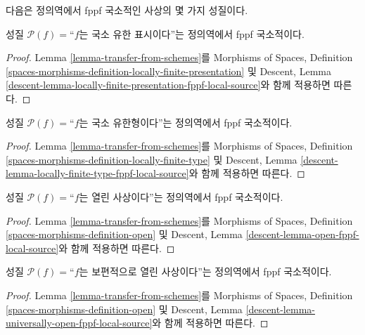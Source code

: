 \noindent
다음은 정의역에서 fppf 국소적인 사상의 몇 가지 성질이다.

\begin{lemma}
\label{lemma-locally-finite-presentation-fppf-local-source}
성질 $\mathcal{P}(f)=$``$f$는 국소 유한 표시이다''는 정의역에서 fppf
국소적이다.
\end{lemma}

\begin{proof}
Lemma \ref{lemma-transfer-from-schemes}를 Morphisms of Spaces, Definition
\ref{spaces-morphisms-definition-locally-finite-presentation} 및 Descent,
Lemma \ref{descent-lemma-locally-finite-presentation-fppf-local-source}와
함께 적용하면 따른다.
\end{proof}

\begin{lemma}
\label{lemma-locally-finite-type-fppf-local-source}
성질 $\mathcal{P}(f)=$``$f$는 국소 유한형이다''는 정의역에서 fppf
국소적이다.
\end{lemma}

\begin{proof}
Lemma \ref{lemma-transfer-from-schemes}를 Morphisms of Spaces, Definition
\ref{spaces-morphisms-definition-locally-finite-type} 및 Descent, Lemma
\ref{descent-lemma-locally-finite-type-fppf-local-source}와 함께 적용하면
따른다.
\end{proof}

\begin{lemma}
\label{lemma-open-fppf-local-source}
성질 $\mathcal{P}(f)=$``$f$는 열린 사상이다''는 정의역에서 fppf
국소적이다.
\end{lemma}

\begin{proof}
Lemma \ref{lemma-transfer-from-schemes}를 Morphisms of Spaces, Definition
\ref{spaces-morphisms-definition-open} 및 Descent, Lemma
\ref{descent-lemma-open-fppf-local-source}와 함께 적용하면 따른다.
\end{proof}

\begin{lemma}
\label{lemma-universally-open-fppf-local-source}
성질 $\mathcal{P}(f)=$``$f$는 보편적으로 열린 사상이다''는 정의역에서
fppf 국소적이다.
\end{lemma}

\begin{proof}
Lemma \ref{lemma-transfer-from-schemes}를 Morphisms of Spaces, Definition
\ref{spaces-morphisms-definition-open} 및 Descent, Lemma
\ref{descent-lemma-universally-open-fppf-local-source}와 함께 적용하면
따른다.
\end{proof}

